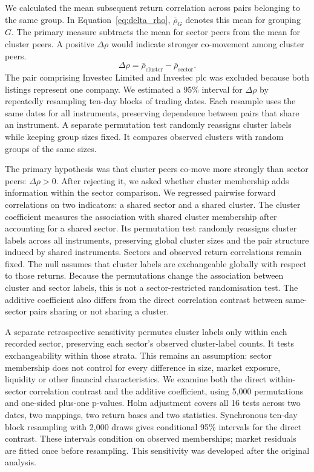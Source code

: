 We calculated the mean subsequent return correlation across pairs belonging to the same group. In Equation~\ref{eq:delta_rho}, $\bar\rho_G$ denotes this mean for grouping $G$. The primary measure subtracts the mean for sector peers from the mean for cluster peers. A positive $\Delta\rho$ would indicate stronger co-movement among cluster peers.
\begin{equation}
\Delta\rho=\bar\rho_{\mathrm{cluster}}-\bar\rho_{\mathrm{sector}}.
\label{eq:delta_rho}\end{equation}
The pair comprising Investec Limited and Investec plc was excluded because both listings represent one company. We estimated a 95\% interval for $\Delta\rho$ by repeatedly resampling ten-day blocks of trading dates. Each resample uses the same dates for all instruments, preserving dependence between pairs that share an instrument. A separate permutation test randomly reassigns cluster labels while keeping group sizes fixed. It compares observed clusters with random groups of the same sizes.

The primary hypothesis was that cluster peers co-move more strongly than sector peers: $\Delta\rho>0$. After rejecting it, we asked whether cluster membership adds information within the sector comparison. We regressed pairwise forward correlations on two indicators: a shared sector and a shared cluster. The cluster coefficient measures the association with shared cluster membership after accounting for a shared sector. Its permutation test randomly reassigns cluster labels across all instruments, preserving global cluster sizes and the pair structure induced by shared instruments. Sectors and observed return correlations remain fixed. The null assumes that cluster labels are exchangeable globally with respect to those returns. Because the permutations change the association between cluster and sector labels, this is not a sector-restricted randomisation test. The additive coefficient also differs from the direct correlation contrast between same-sector pairs sharing or not sharing a cluster.

A separate retrospective sensitivity permutes cluster labels only within each recorded sector, preserving each sector's observed cluster-label counts. It tests exchangeability within those strata. This remains an assumption: sector membership does not control for every difference in size, market exposure, liquidity or other financial characteristics. We examine both the direct within-sector correlation contrast and the additive coefficient, using 5,000 permutations and one-sided plus-one p-values. Holm adjustment covers all 16 tests across two dates, two mappings, two return bases and two statistics. Synchronous ten-day block resampling with 2,000 draws gives conditional 95\% intervals for the direct contrast. These intervals condition on observed memberships; market residuals are fitted once before resampling. This sensitivity was developed after the original analysis.

